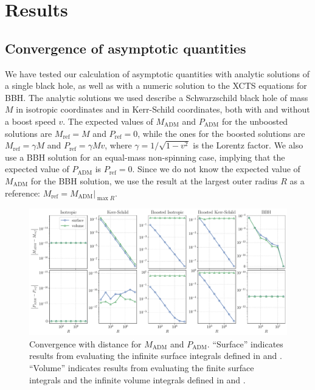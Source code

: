 \documentclass{../document}
\begin{document}
  \section{Results}

    \subsection{Convergence of asymptotic quantities}

      We have tested our calculation of asymptotic quantities with analytic solutions of a single black hole, as well as with a numeric solution to the XCTS equations for BBH. The analytic solutions we used describe a Schwarzschild black hole of mass $M$ in isotropic coordinates and in Kerr-Schild coordinates, both with and without a boost speed $v$. The expected values of $M_\text{ADM}$ and $P_\text{ADM}$ for the unboosted solutions are $M_\text{ref} = M$ and $P_\text{ref} = 0$, while the ones for the boosted solutions are $M_\text{ref} = \gamma M$ and $P_\text{ref} = \gamma M v$, where $\gamma = 1 / \sqrt{1 - v^2}$ is the Lorentz factor. We also use a BBH solution for an equal-mass non-spinning case, implying that the expected value of $P_\text{ADM}$ is $P_\text{ref} = 0$. Since we do not know the expected value of $M_\text{ADM}$ for the BBH solution, we use the result at the largest outer radius $R$ as a reference: $M_\text{ref} = M_\text{ADM} |_{\max R}$.

      \begin{figure}
        \centering
        \includegraphics[width=\textwidth]{../../plots/final_report/distance_convergence_Madm_Padm.pdf}
        \caption{Convergence with distance for $M_\text{ADM}$ and $P_\text{ADM}$. ``Surface'' indicates results from evaluating the infinite surface integrals defined in \eq{\eqref{eq:Madm-surf}} and \eq{\eqref{eq:Padm-surf}}. ``Volume'' indicates results from evaluating the finite surface integrals and the infinite volume integrals defined in \eq{\eqref{eq:Madm-mixed}} and \eq{\eqref{eq:Padm-mixed}}.}
        \label{fig:distance_convergence_Madm_Padm}
      \end{figure}
\end{document}
